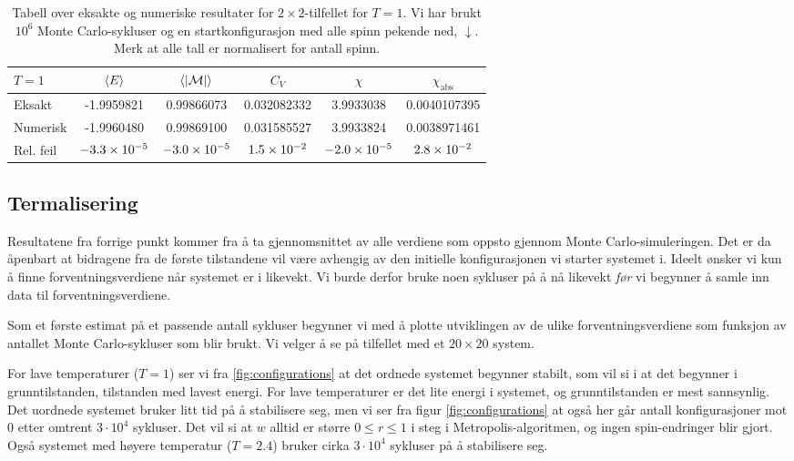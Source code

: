 \documentclass[11pt]{article}
\newcommand{\abs}[1]{|#1|}
\begin{document}
\begin{table}
\centering
\caption{Tabell over eksakte og numeriske resultater for $2\times
  2$-tilfellet for $T=1$. Vi har brukt $10^6$ Monte Carlo-sykluser og
  en startkonfigurasjon med alle spinn pekende ned, $\downarrow$. Merk at
alle tall er normalisert for antall spinn.}
\label{tab:2x2-eksakt-num}
\vspace{0.1cm}
\begin{tabular}{l|ccccc}
$T=1$ & $\langle E \rangle$ & $\mean{ \abs{\mathcal{M} } }$ & $C_V$ & $\chi$ & $\chi_\text{abs}$ \\
\hline
Eksakt & -1.9959821 & 0.99866073 & 0.032082332 & 3.9933038 & 0.0040107395 \\
Numerisk & -1.9960480 & 0.99869100 & 0.031585527 & 3.9933824 & 0.0038971461 \\
Rel. feil & $-3.3\times 10^{-5}$ & $-3.0\times 10^{-5}$ & $1.5\times 10^{-2}$  & $-2.0\times 10^{-5}$ & $2.8\times 10^{-2}$ 
\end{tabular}
\end{table}



\subsection{Termalisering}
Resultatene fra forrige punkt kommer fra å ta gjennomsnittet av alle
verdiene som oppsto gjennom Monte Carlo-simuleringen. Det er da
åpenbart at bidragene fra de første tilstandene vil være avhengig av
den initielle konfigurasjonen vi starter systemet i. Ideelt ønsker vi
kun å finne forventningsverdiene når systemet er i likevekt. Vi burde
derfor bruke noen sykluser på å nå likevekt \textit{før} vi
begynner å samle inn data til forventningsverdiene. 

Som et første estimat på et passende antall sykluser begynner vi med å
plotte utviklingen av de ulike forventningsverdiene som funksjon av
antallet Monte Carlo-sykluser som blir brukt. Vi velger å se på
tilfellet med et $20\times 20$ system. 

For lave temperaturer ($T = 1$) ser vi fra \ref{fig:configurations} at det ordnede systemet
begynner stabilt, som vil si i at det begynner i grunntilstanden,
tilstanden med lavest energi. For lave temperaturer er det lite energi
i systemet, og grunntilstanden er mest sannsynlig. Det uordnede 
systemet bruker litt tid på å stabilisere seg, men vi ser fra
figur \ref{fig:configurations} at også her går antall konfigurasjoner mot 0
etter omtrent $3 \cdot 10^4$ sykluser. Det vil si at $w$ alltid er
større $0\leq r\leq 1$ i steg \label{steg6} i Metropolis-algoritmen,
og ingen spin-endringer blir gjort. Også systemet med høyere
temperatur ($T=2.4$) bruker cirka $3 \cdot 10^4$ sykluser på å
stabilisere seg.
\end{document}
